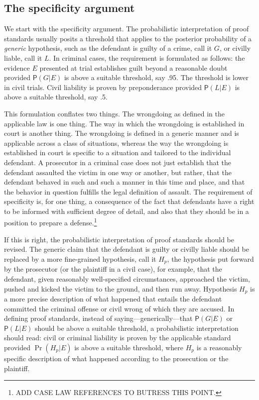 \documentclass[
  10pt,
  dvipsnames,enabledeprecatedfontcommands]{scrartcl}
\newcommand{\pr}[1]{\ensuremath{\mathsf{P}(#1)}}
\begin{document}
\hypertarget{the-specificity-argument}{%
\subsection{The specificity argument}\label{the-specificity-argument}}

We start with the specificity argument. The probabilistic interpretation
of proof standards usually posits a threshold that applies to the
posterior probability of a \emph{generic} hypothesis, such as the
defendant is guilty of a crime, call it \(G\), or civilly liable, call
it \(L\). In criminal cases, the requirement is formulated as follows:
the evidence \(E\) presented at trial establishes guilt beyond a
reasonable doubt provided \(\pr{G \vert E}\) is above a suitable
threshold, say .95. The threshold is lower in civil trials. Civil
liability is proven by preponderance provided \(\pr{L \vert E}\) is
above a suitable threshold, say .5.

This formulation conflates two things. The wrongdoing as defined in the
applicable law is one thing. The way in which the wrongdoing is
established in court is another thing. The wrongdoing is defined in a
generic manner and is applicable across a class of situations, whereas
the way the wrongdoing is established in court is specific to a
situation and tailored to the individual defendant. A prosecutor in a
criminal case does not just establish that the defendant assaulted the
victim in one way or another, but rather, that the defendant behaved in
such and such a manner in this time and place, and that the behavior in
question fulfills the legal definition of assault. The requirement of
specificity is, for one thing, a consequence of the fact that defendants
have a right to be informed with sufficient degree of detail, and also
that they should be in a position to prepare a defense.\footnote{ADD
  CASE LAW REFERENCES TO BUTRESS THIS POINT.}

If this is right, the probabilistic interpretation of proof standards
should be revised. The generic claim that the defendant is guilty or
civilly liable should be replaced by a more fine-grained hypothesis,
call it \(H_p\), the hypothesis put forward by the prosecutor (or the
plaintiff in a civil case), for example, that the defendant, given
reasonably well-specified circumstances, approached the victim, pushed
and kicked the victim to the ground, and then run away. Hypothesis
\(H_p\) is a more precise description of what happened that entails the
defendant committed the criminal offense or civil wrong of which they
are accused. In defining proof standards, instead of
saying---generically---that \(\pr{G \vert E}\) or \(\pr{L \vert E}\)
should be above a suitable threshold, a probabilistic interpretation
should read: civil or criminal liability is proven by the applicable
standard provided \(\Pr(H_p \vert E)\) is above a suitable threshold,
where \(H_p\) is a reasonably specific description of what happened
according to the prosecution or the plaintiff.
\end{document}
